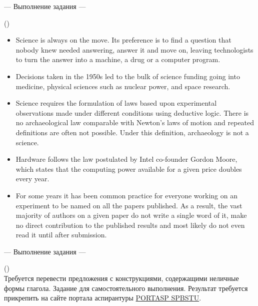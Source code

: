 \documentclass[main.tex]{subfiles}
\begin{document}
\newpage
{}

\hypertarget{ltask:2024-04-10-2}{--- Выполнение задания ---} (\hyperref[task:2024-04-10-2]{\color{blue}{перейти к тексту задания}})
\\

\vspace{5pt}
\begin{itemize}[nosep, leftmargin=*]
	\itemsep10pt
	\item Science is always on the move. Its preference is to find a question that nobody knew needed answering, answer it and move on, leaving technologists to turn the answer into a machine, a drug or a computer program.
	\item Decisions taken in the 1950s led to the bulk of science funding going into medicine, physical sciences such as nuclear power, and space research.
	\item Science requires the formulation of laws based upon experimental observations made under different conditions using deductive logic. There is no archaeological law comparable with Newton's laws of motion and repeated definitions are often not possible. Under this definition, archaeology is not a science.
	\item Hardware follows the law postulated by Intel co-founder Gordon Moore, which states that the computing power available for a given price doubles every year.
	\item For some years it has been common practice for everyone working on an experiment to be named on all the papers published. As a result, the vast majority of authors on a given paper do not write a single word of it, make no direct contribution to the published results and most likely do not even read it until after submission.
\end{itemize}

\newpage
{}

\hypertarget{ltask:2024-04-10-3}{--- Выполнение задания ---} (\hyperref[task:2024-04-10-3]{\color{blue}{перейти к тексту задания}})
\\

Требуется перевести предложения с конструкциями, содержащими неличные формы глагола.
Задание для самостоятельного выполнения.
Результат требуется прикрепить на сайте портала аспирантуры \href{https://portasp.spbstu.ru/login/index.php}{PORTASP SPBSTU}.
\end{document}
